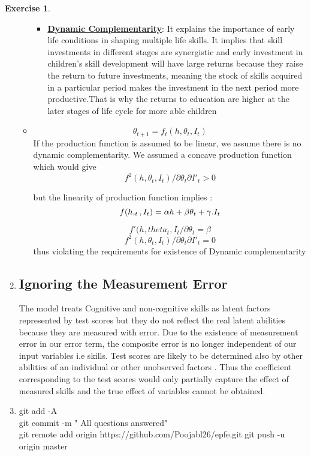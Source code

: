 \documentclass[11pt,a4paper,leqno]{article}
\theoremstyle{definition}
\newtheorem{exercise}{Exercise}
\renewcommand{\theenumi}{\roman{enumi}}
\begin{document}
\begin{exercise}
\begin{enumerate}
\begin{itemize}
\begin{itemize}
         
       \item \textbf{\underline{Dynamic Complementarity}}: It explains the importance of early life conditions in shaping multiple life skills. It implies that skill investments in different stages are synergistic and early investment in children’s skill
        development will have large returns because they raise the return to future investments, meaning the stock of skills acquired in a particular period makes the investment in the next period more productive.That is why the returns to education are higher at the later stages of life cycle for more able children
        \newline
        \end{itemize}
        
        \item $$ \theta_{t+1} = f_{t}(h, \theta_{t}, I_{t}) $$ 
         If the production function is assumed to be linear, we assume there is no dynamic complementarity. 
        We assumed a concave production function which would give $$ f^{2}(h, \theta_{t}, I_{t})/ \partial \theta_{t} \partial I'_{t} > 0 $$
        
        but the linearity of production function implies : $$ f(h, \theenumi_{t}, I_{t}) = \alpha h + \beta\theta_{t} + \gamma.I_{t}$$
        
         $$ f'(h, theta_{t}, I_{t} / \partial\theta_{t} = \beta $$
         $$f^{2} (h, \theta_{t}, I_{t})/ \partial\theta_{t} \partial I'_{t} =0 $$ 
         thus violating the requirements for existence of Dynamic complementarity
          \end{itemize}
        



    \item \subsection*{Ignoring the Measurement Error} 
    The model treats Cognitive and non-cognitive skills as latent factors represented by test scores but they do not reflect the real latent abilities because they are measured with error. Due to the existence of measurement error in our error term, the composite error is no longer independent of  our input variables i.e skills.
   Test scores are likely to be determined also by other abilities of an individual or other unobserved factors . Thus the coefficient corresponding to the test scores would only partially capture the effect of measured skills and the true effect of variables cannot be obtained. 
   
   \item git add -A \\
   git commit -m " All questions answered"\\
   git remote add origin https://github.com/Poojabl26/epfe.git
   git push -u origin master
   
    \end{enumerate}
\end{exercise}
\end{document}

